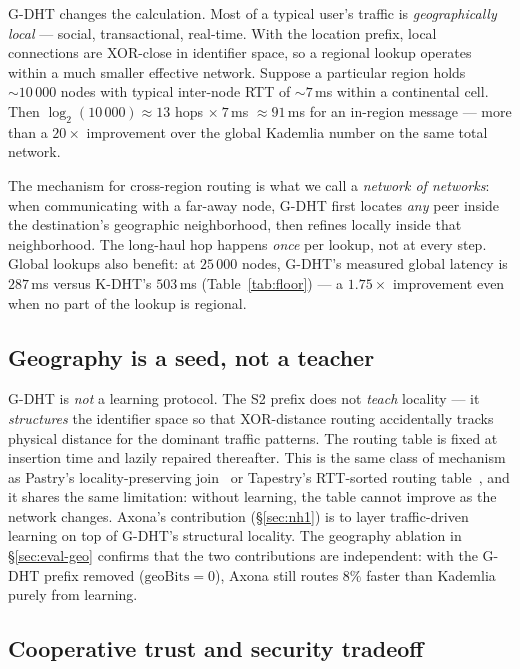 \documentclass[conference]{IEEEtran}
\newcommand{\axona}{Axona\xspace}
\newcommand{\GDHT}{G-DHT\xspace}
\begin{document}
\GDHT changes the calculation. Most of a typical user's traffic is
\emph{geographically local} --- social, transactional, real-time. With
the location prefix, local connections are XOR-close in identifier
space, so a regional lookup operates within a much smaller effective
network. Suppose a particular region holds $\sim\!10\,000$ nodes with
typical inter-node RTT of $\sim\!7$\,ms within a continental cell.
Then $\log_2(10\,000) \approx 13$ hops $\times\ 7$\,ms $\approx
91$\,ms for an in-region message --- more than a $20\times$ improvement
over the global Kademlia number on the same total network.

The mechanism for cross-region routing is what we call a
\emph{network of networks}: when communicating with a far-away node,
\GDHT first locates \emph{any} peer inside the destination's
geographic neighborhood, then refines locally inside that
neighborhood. The long-haul hop happens \emph{once} per lookup, not
at every step. Global lookups also benefit: at $25\,000$ nodes,
\GDHT's measured global latency is $287$\,ms versus K-DHT's
$503$\,ms (Table~\ref{tab:floor}) --- a $1.75\times$ improvement
even when no part of the lookup is regional.

\subsection{Geography is a seed, not a teacher}
\label{sec:gdht-seed}

\GDHT is \emph{not} a learning protocol. The S2 prefix does not
\emph{teach} locality --- it \emph{structures} the identifier space so
that XOR-distance routing accidentally tracks physical distance for
the dominant traffic patterns. The routing table is fixed at
insertion time and lazily repaired thereafter. This is the same
class of mechanism as Pastry's locality-preserving
join~\cite{rowstron2001pastry} or Tapestry's RTT-sorted routing
table~\cite{zhao2004tapestry}, and it shares the same limitation:
without learning, the table cannot improve as the network changes.
\axona's contribution (\S\ref{sec:nh1}) is to layer
traffic-driven learning on top of \GDHT's structural locality.
The geography ablation in \S\ref{sec:eval-geo} confirms that the
two contributions are independent: with the \GDHT prefix removed
($\mathrm{geoBits} = 0$), \axona still routes $8\%$ faster than
Kademlia purely from learning.

\subsection{Cooperative trust and security tradeoff}
\label{sec:gdht-trust}
\end{document}

